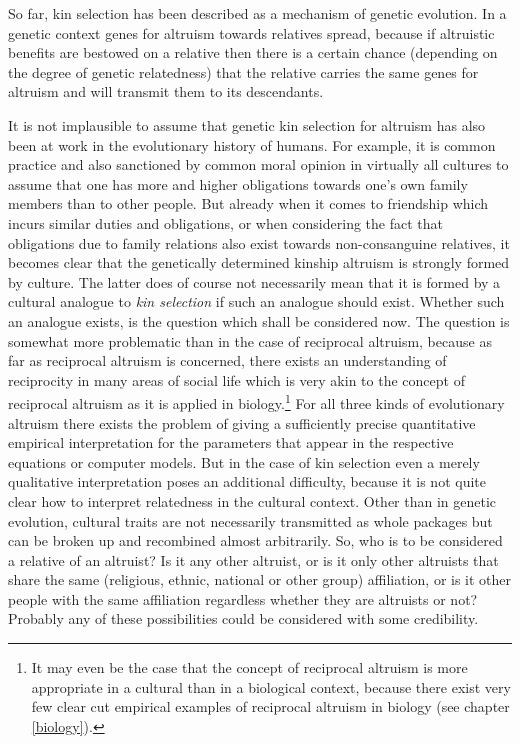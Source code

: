 So far, kin selection has been described as a mechanism of genetic evolution.
In a genetic context genes for altruism towards relatives spread, because if
altruistic benefits are bestowed on a relative then there is a certain chance
(depending on the degree of genetic relatedness) that the relative carries the
same genes for altruism and will transmit them to its descendants.

It is not implausible to assume that genetic kin selection for altruism has
also been at work in the evolutionary history of humans. For example, it is
common practice and also sanctioned by common moral opinion in virtually all
cultures to assume that one has more and higher obligations towards one's own
family members than to other people. But already when it comes to friendship
which incurs similar duties and obligations, or when considering the fact
that obligations due to family relations also exist towards non-consanguine
relatives, it becomes clear that the genetically determined kinship altruism is
strongly formed by culture.  The latter does of course not necessarily mean
that it is formed by a cultural analogue to {\em kin selection} if such an
analogue should exist.  Whether such an analogue exists, is the question which
shall be considered now. The question is somewhat more problematic than
in the case of reciprocal altruism, because as far as reciprocal altruism is
concerned, there exists an understanding of reciprocity in many areas of social
life which is very akin to the concept of reciprocal altruism as it is
applied in biology.\footnote{It may even be the case that the concept of
  reciprocal altruism is more appropriate in a cultural than in a biological
  context, because there exist very few clear cut empirical examples of
  reciprocal altruism in biology (see chapter \ref{biology}).} For all three
kinds of evolutionary altruism there exists the problem of giving a sufficiently
precise quantitative empirical interpretation for the parameters that appear
in the respective equations or computer models. But in the case of kin
selection even a merely qualitative interpretation poses an additional
difficulty, because it is not quite clear how to interpret relatedness in the
cultural context. Other than in genetic evolution, cultural traits are not
necessarily transmitted as whole packages but can be broken up and recombined
almost arbitrarily. So, who is to be considered a relative of an altruist? Is
it any other altruist, or is it only other altruists that share the same
(religious, ethnic, national or other group) affiliation, or is it other
people with the same affiliation regardless whether they are altruists or not?
Probably any of these possibilities could be considered with some credibility.

